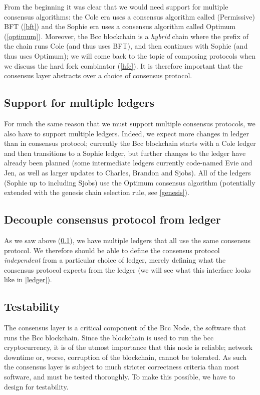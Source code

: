 From the beginning it was clear that we would need support for multiple
consensus algorithms: the Cole era uses a consensus algorithm called
(Permissive) BFT (\cref{bft}) and the Sophie era uses a consensus algorithm
called Optimum (\cref{optimum}). Moreover, the Bcc blockchain is a \emph{hybrid}
chain where the prefix of the chain runs Cole (and thus uses BFT), and then
continues with Sophie (and thus uses Optimum); we will come back to the topic of
composing protocols when we discuss the hard fork combinator (\cref{hfc}). It is
therefore important that the consensus layer abstracts over a choice of
consensus protocol.

\subsection{Support for multiple ledgers}
\label{multiple-ledgers}

For much the same reason that we must support multiple consensus protocols, we
also have to support multiple ledgers. Indeed, we expect more changes in ledger
than in consensus protocol; currently the Bcc blockchain starts with a
Cole ledger and then transitions to a Sophie ledger, but further changes to
the ledger have already been planned (some intermediate ledgers currently
code-named Evie and Jen, as well as larger updates to Charles, Brandon and
Sjobs). All of the ledgers (Sophie up to including Sjobs)
use the Optimum consensus algorithm (potentially extended with the genesis chain
selection rule, see \cref{genesis}).

\subsection{Decouple consensus protocol from ledger}
\label{decouple-consensus-ledger}

As we saw above (\cref{multiple-ledgers}), we have multiple ledgers that all
use the same consensus protocol. We therefore should be able to define the
consensus protocol \emph{independent} from a particular choice of ledger,
merely defining what the consensus protocol expects from the ledger
(we will see what this interface looks like in \cref{ledger}).

\subsection{Testability}
\label{testability}

The consensus layer is a critical component of the Bcc Node, the software
that runs the Bcc blockchain. Since the blockchain is used to run the bcc
cryptocurrency, it is of the utmost importance that this node is reliable;
network downtime or, worse, corruption of the blockchain, cannot be tolerated.
As such the consensus layer is subject to much stricter correctness criteria
than most software, and must be tested thoroughly. To make this possible, we
have to design for testability.

